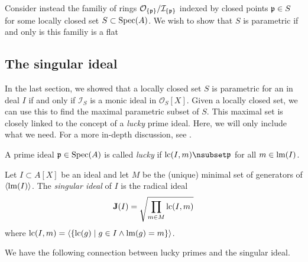 Consider instead the familiy of rings $\mathcal O_{\{\mathfrak p\}}/\mathcal I_{\{\mathfrak p\}}$ indexed by closed points $\mathfrak p \in S$ for some locally closed set $S \subset \operatorname{Spec}(A)$. We wish to show that $S$ is parametric if and only is this familiy is a flat









\subsection{The singular ideal}
In the last section, we showed that a locally closed set $S$ is parametric for an in deal $I$ if and only if $\mathcal I_{S}$ is a monic ideal in $\mathcal O_{S}[X]$. Given a locally closed set, we can use this to find the maximal parametric subset of $S$. This maximal set is closely linked to the concept of a \textit{lucky} prime ideal. Here, we will only include what we need. For a more in-depth discussion, see \cite{grb_covers}.

\begin{definition}\label{def:lucky}
  A prime ideal $\mathfrak p \in \operatorname{Spec}(A)$ is called \textit{lucky} if $\LC(I, m) \nsubset \p$ for all $m \in \operatorname{lm}(I)$.
\end{definition}

\begin{definition}
  Let $I \subset A[X]$ be an ideal and let $M$ be the (unique) minimal set of generators of $\langle \operatorname{lm}(I) \rangle$. The \textit{singular ideal} of $I$ is the radical ideal
  \[\operatorname{\mathbf J}(I) = \sqrt{\prod_{m \in M} \operatorname{lc}(I, m)}\]
  where $\operatorname{lc}(I, m) = \langle \{\operatorname{lc}(g) \mid g \in I \land \operatorname{lm}(g) = m\} \rangle$.
\end{definition}

We have the following connection between lucky primes and the singular ideal.

